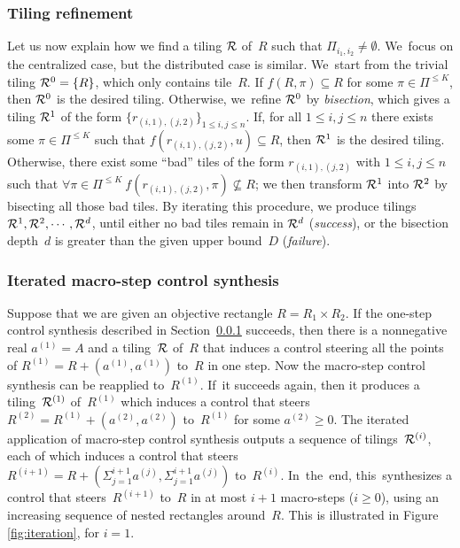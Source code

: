 \subsubsection{Tiling refinement}\label{ss:refinement}
Let us now explain how we find a tiling ${\cal R}$ of~$R$
such that $\Pi_{i_1,i_2}\neq \emptyset$.
We~focus on the centralized case, but the distributed case is similar.
We~start from the trivial tiling ${\cal R}^0=\{R\}$, which only contains
tile~$R$. If $f(R,\pi)\subseteq R$ for some $\pi\in \Pi^{\leq K}$,
then ${\cal R}^0$ is the desired tiling. Otherwise,
we~refine ${\cal R}^0$ by \emph{bisection}, which gives
a tiling ${\cal R}^1$ of the form $\{r_{(i,1),(j,2)}\}_{1\leq i,j\leq n}$.
If, for all $1\leq i,j\leq n$ there exists some $\pi\in \Pi^{\leq K}$ such that
$f(r_{(i,1),(j,2)},u)\subseteq R$, then ${\cal R}^1$ is the desired tiling.
Otherwise, there exist some ``bad'' tiles of the form $r_{(i,1),(j,2)}$
with $1\leq i,j\leq n$ such that $\forall \pi\in \Pi^{\leq K}\ f(r_{(i,1),(j,2)},\pi)\not\subseteq R$;
we then transform ${\cal R}^1$ into ${\cal R}^2$ by bisecting
all those bad tiles. By iterating this procedure, 
we produce tilings ${\cal R}^1, {\cal R}^2,\cdots, {\cal R}^d$, until
either no bad tiles remain in ${\cal R}^d$ (\emph{success}), 
or the bisection depth~$d$ is greater than
the given upper bound~$D$ (\emph{failure}).



\subsubsection{Iterated macro-step control synthesis}\label{ss:iteration}
Suppose that we are given an objective rectangle $R=R_1\times R_2$.
If the one-step control synthesis described in
Section~\ref{ss:refinement} succeeds, then there is a nonnegative real
$a^{(1)}=A$ and a tiling~${\cal R}$ of~$R$ that induces a control
steering all the points of $R^{(1)}=R+(a^{(1)},a^{(1)})$ to~$R$ in one
step.  Now the macro-step control synthesis can be reapplied
to~$R^{(1)}$.  If~it succeeds again, then it produces a tiling~${\cal
  R}^{(1)}$ of~$R^{(1)}$ which induces a control that steers
$R^{(2)}=R^{(1)}+(a^{(2)},a^{(2)})$ to~$R^{(1)}$ for some $a^{(2)}\geq
0$.
The iterated application
of macro-step control synthesis outputs a sequence of 
tilings~${\cal R}^{(i)}$,
each of which induces a control that steers 
$R^{(i+1)}=R+(\Sigma_{j=1}^{i+1}a^{(j)},\Sigma_{j=1}^{i+1}a^{(j)})$ 
to~$R^{(i)}$.
In~the~end, this~synthesizes a control that steers~$R^{(i+1)}$
to~$R$ in at most $i+1$ macro-steps ($i\geq 0$),
using an increasing sequence of 
nested rectangles around~$R$.
This is illustrated in Figure \ref{fig:iteration}, for $i=1$.


